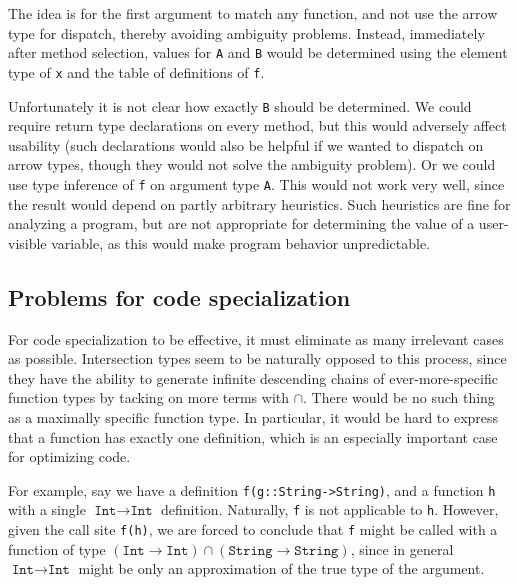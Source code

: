 The idea is for the first argument to match any function, and not use
the arrow type for dispatch, thereby avoiding ambiguity problems.
Instead, immediately after method selection, values for \texttt{A} and
\texttt{B} would be determined using the element type of \texttt{x}
and the table of definitions of \texttt{f}.

Unfortunately it is not clear how exactly \texttt{B} should be
determined. We could require return type declarations on every method,
but this would adversely affect usability (such declarations would also
be helpful if we wanted to dispatch on arrow types, though they would
not solve the ambiguity problem). Or we could use type inference
of \texttt{f} on argument type \texttt{A}. This would not work very
well, since the result would depend on partly arbitrary heuristics.
Such heuristics are fine for analyzing a program, but
are not appropriate for determining the value of a user-visible
variable, as this would make program behavior unpredictable.

\subsection{Problems for code specialization}

For code specialization to be effective, it must eliminate as many
irrelevant cases as possible. Intersection types seem to be naturally
opposed to this process, since they have the ability to
generate infinite descending chains of ever-more-specific function
types by tacking on more terms with $\cap$. There would be no such
thing as a maximally specific function type. In particular, it would be
hard to express that a function has exactly one definition,
which is an especially important case for optimizing code.

For example, say we have a definition \texttt{f(g::String->String)},
and a function \texttt{h} with a single $\texttt{Int}\rightarrow\texttt{Int}$ definition.
Naturally, \texttt{f} is not applicable to \texttt{h}.
However, given the call site \texttt{f(h)}, we are forced to conclude
that \texttt{f} might be called with a function of type
\mbox{$(\texttt{Int}\rightarrow\texttt{Int})\cap(\texttt{String}\rightarrow\texttt{String})$},
since in general $\texttt{Int}\rightarrow\texttt{Int}$ might be only an
approximation of the true type of the argument.


